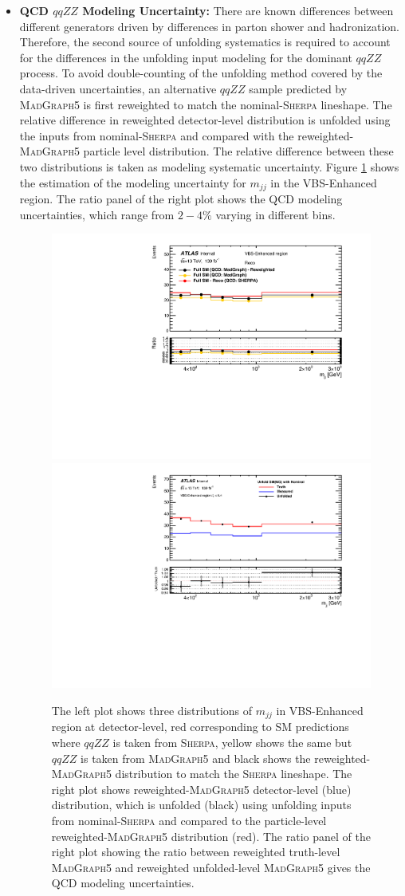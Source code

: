 \begin{itemize}
{    }

    \item{\textbf{QCD $qqZZ$ Modeling Uncertainty:} There are known differences between different generators driven by differences in parton shower and hadronization. Therefore, the second source of unfolding systematics is required to account for the differences in the unfolding input modeling for the dominant $qqZZ$ process. To avoid double-counting of the unfolding method covered by the data-driven uncertainties, an alternative $qqZZ$ sample predicted by \textsc{MadGraph5} is first reweighted to match the nominal-\textsc{Sherpa} lineshape. The relative difference in reweighted detector-level distribution is unfolded using the inputs from nominal-\textsc{Sherpa} and compared with the reweighted-\textsc{MadGraph5} particle level distribution. The relative difference between these two distributions is taken as modeling systematic uncertainty. Figure \ref{fig:QCDModelUnc} shows the estimation of the modeling uncertainty for $m_{jj}$ in the VBS-Enhanced region. The ratio panel of the right plot shows the QCD modeling uncertainties, which range from $2-4\%$ varying in different bins.
    
    \begin{figure}
        \centering
        \includegraphics[width=.48\linewidth]{figures/Analysis/Systematics/QCDmodel_Dist.pdf}
        \includegraphics[width=.48\linewidth]{figures/Analysis/Systematics/QCDmodel_Unc.pdf}
        \caption{The left plot shows three distributions of $m_{jj}$ in VBS-Enhanced region at detector-level, red corresponding to SM predictions where $qqZZ$ is taken from \textsc{Sherpa}, yellow shows the same but $qqZZ$ is taken from \textsc{MadGraph5} and black shows the reweighted-\textsc{MadGraph5} distribution to match the \textsc{Sherpa} lineshape. The right plot shows reweighted-\textsc{MadGraph5} detector-level (blue) distribution, which is unfolded (black) using unfolding inputs from nominal-\textsc{Sherpa} and compared to the particle-level reweighted-\textsc{MadGraph5} distribution (red). The ratio panel of the right plot showing the ratio between reweighted truth-level \textsc{MadGraph5} and reweighted unfolded-level \textsc{MadGraph5} gives the QCD modeling uncertainties. \label{fig:QCDModelUnc}}
 \end{figure}  

}
\end{itemize}
